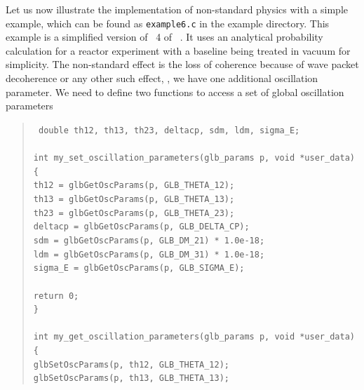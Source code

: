 Let us now illustrate the implementation of non-standard physics with a simple example, which can
be found as {\tt example6.c} in the example directory.
This example is a simplified version of \Sec~4 of 
\Ref~\cite{Blennow:2005yk}.
It uses an analytical probability calculation for a reactor experiment with a baseline being treated
in vacuum for simplicity. The non-standard effect is the loss of coherence because of wave packet decoherence
or any other such effect, \ie, we have one additional oscillation parameter. We need to define two functions to access a set of 
global oscillation parameters
\begin{quote}
{\tt 
double th12, th13, th23, deltacp, sdm, ldm, sigma\_E; \\
\\
int my\_set\_oscillation\_parameters(glb\_params p, void *user\_data) \\
\{ \\
 \hspace*{0.5cm} th12    = glbGetOscParams(p, GLB\_THETA\_12); \\
 \hspace*{0.5cm} th13    = glbGetOscParams(p, GLB\_THETA\_13); \\
 \hspace*{0.5cm} th23    = glbGetOscParams(p, GLB\_THETA\_23); \\
 \hspace*{0.5cm} deltacp = glbGetOscParams(p, GLB\_DELTA\_CP); \\
 \hspace*{0.5cm} sdm     = glbGetOscParams(p, GLB\_DM\_21) * 1.0e-18;  \\
 \hspace*{0.5cm} ldm     = glbGetOscParams(p, GLB\_DM\_31) * 1.0e-18;  \\
 \hspace*{0.5cm} sigma\_E = glbGetOscParams(p, GLB\_SIGMA\_E); \\
\\
 \hspace*{0.5cm}  return 0; \\
\} \\
\\
int my\_get\_oscillation\_parameters(glb\_params p, void *user\_data) \\
\{ \\
  \hspace*{0.5cm} glbSetOscParams(p, th12, GLB\_THETA\_12); \\
  \hspace*{0.5cm} glbSetOscParams(p, th13, GLB\_THETA\_13); \\
}
\end{quote}
